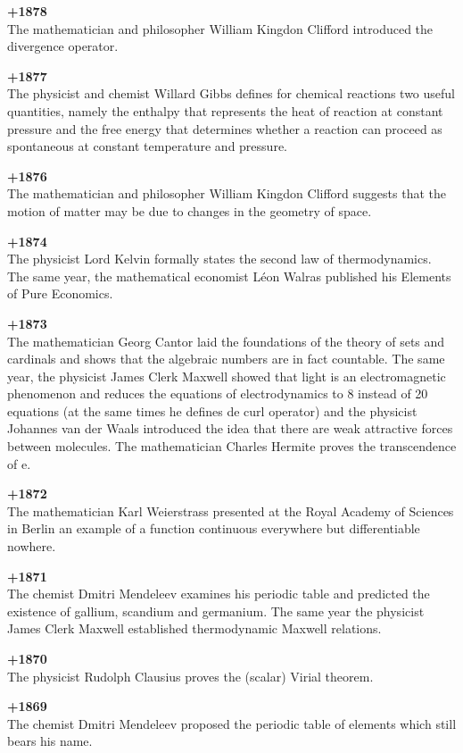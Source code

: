 \textbf{+1878}\\
The mathematician and philosopher William Kingdon Clifford introduced the divergence operator.

\textbf{+1877}\\
The physicist and chemist Willard Gibbs defines for chemical reactions two useful quantities, namely the enthalpy that represents the heat of reaction at constant pressure and the free energy that determines whether a reaction can proceed as spontaneous at constant temperature and pressure.

\textbf{+1876}\\
The mathematician and philosopher William Kingdon Clifford suggests that the motion of matter may be due to changes in the geometry of space.

\textbf{+1874}\\
The physicist Lord Kelvin formally states the second law of thermodynamics. The same year, the mathematical economist Léon Walras published his Elements of Pure Economics.

\textbf{+1873}\\
The mathematician Georg Cantor laid the foundations of the theory of sets and cardinals and shows that the algebraic numbers are in fact countable. The same year, the physicist James Clerk Maxwell showed that light is an electromagnetic phenomenon and reduces the equations of electrodynamics to 8 instead of 20 equations (at the same times he defines de curl operator) and the physicist Johannes van der Waals introduced the idea that there are weak attractive forces between molecules. The mathematician Charles Hermite proves the transcendence of e.

\textbf{+1872}\\
The mathematician Karl Weierstrass presented at the Royal Academy of Sciences in Berlin an example of a function continuous everywhere but differentiable nowhere.

\textbf{+1871}\\
The chemist Dmitri Mendeleev examines his periodic table and predicted the existence of gallium, scandium and germanium. The same year the physicist James Clerk Maxwell established thermodynamic Maxwell relations. 

\textbf{+1870}\\
The physicist Rudolph Clausius proves the (scalar) Virial theorem.

\textbf{+1869}\\
The chemist Dmitri Mendeleev proposed the periodic table of elements which still bears his name.


